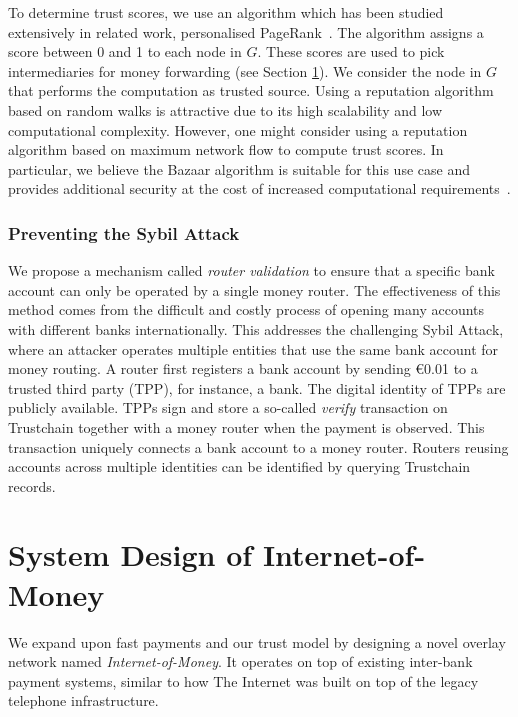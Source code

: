 To determine trust scores, we use an algorithm which has been studied extensively in related work, personalised PageRank~\cite{page1999pagerank}. %
The algorithm assigns a score between 0 and 1 to each node in $ G $.
These scores are used to pick intermediaries for money forwarding (see Section \ref{sec:system_design}).
We consider the node in $ G $ that performs the computation as trusted source.
Using a reputation algorithm based on random walks is attractive due to its high scalability and low computational complexity.
However, one might consider using a reputation algorithm based on maximum network flow to compute trust scores.
In particular, we believe the Bazaar algorithm is suitable for this use case and provides additional security at the cost of increased computational requirements~\cite{post2011bazaar}.

\subsubsection*{Preventing the Sybil Attack}
We propose a mechanism called \emph{router validation} to ensure that a specific bank account can only be operated by a single money router.
The effectiveness of this method comes from the difficult and costly process of opening many accounts with different banks internationally. %
This addresses the challenging Sybil Attack, where an attacker operates multiple entities that use the same bank account for money routing.
A router first registers a bank account by sending \euro 0.01 to a trusted third party (TPP), for instance, a bank.
The digital identity of TPPs are publicly available.
TPPs sign and store a so-called \emph{verify} transaction on Trustchain together with a money router when the payment is observed.
This transaction uniquely connects a bank account to a money router.
Routers reusing accounts across multiple identities can be identified by querying Trustchain records.

\section{System Design of Internet-of-Money}
\label{sec:system_design}
We expand upon fast payments and our trust model by designing a novel overlay network named \emph{Internet-of-Money}.
It operates on top of existing inter-bank payment systems, similar to how The Internet was built on top of the legacy telephone infrastructure.

